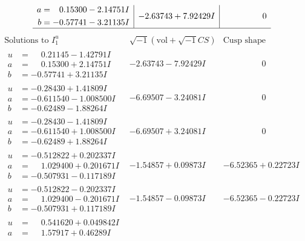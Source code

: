\documentclass[1p]{elsarticle_modified}
\theoremstyle{definition}
\newcommand{\I}{\sqrt{-1}}
\begin{document}
$$\begin{array}{c|c|c}
\begin{aligned}
a &= \phantom{-}0.15300 - 2.14751 I \\
b &= -0.57741 - 3.21135 I\end{aligned}
 & -2.63743 + 7.92429 I & \phantom{-0.000000 } 0\\
 \hline 
 \end{array}$$\newpage$$\begin{array}{c|c|c}  
\text{Solutions to }I^u_{1}& \I (\text{vol} + \sqrt{-1}CS) & \text{Cusp shape}\\
 \hline 
\begin{aligned}
u &= \phantom{-}0.21145 - 1.42791 I \\
a &= \phantom{-}0.15300 + 2.14751 I \\
b &= -0.57741 + 3.21135 I\end{aligned}
 & -2.63743 - 7.92429 I & \phantom{-0.000000 } 0 \\ \hline\begin{aligned}
u &= -0.28430 + 1.41809 I \\
a &= -0.611540 - 1.008500 I \\
b &= -0.62489 - 1.88264 I\end{aligned}
 & -6.69507 - 3.24081 I & \phantom{-0.000000 } 0 \\ \hline\begin{aligned}
u &= -0.28430 - 1.41809 I \\
a &= -0.611540 + 1.008500 I \\
b &= -0.62489 + 1.88264 I\end{aligned}
 & -6.69507 + 3.24081 I & \phantom{-0.000000 } 0 \\ \hline\begin{aligned}
u &= -0.512822 + 0.202337 I \\
a &= \phantom{-}1.029400 + 0.201671 I \\
b &= -0.507931 - 0.117189 I\end{aligned}
 & -1.54857 + 0.09873 I & -6.52365 + 0.22723 I \\ \hline\begin{aligned}
u &= -0.512822 - 0.202337 I \\
a &= \phantom{-}1.029400 - 0.201671 I \\
b &= -0.507931 + 0.117189 I\end{aligned}
 & -1.54857 - 0.09873 I & -6.52365 - 0.22723 I \\ \hline\begin{aligned}
u &= \phantom{-}0.541620 + 0.049842 I \\
a &= \phantom{-}1.57917 + 0.46289 I \\

\end{aligned}
\end{array}$$
\end{document}
